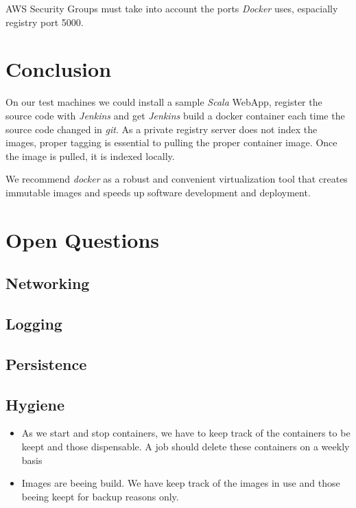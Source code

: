 \documentclass[11pt]{article}
\begin{document}
AWS Security Groups must take into account the ports \emph{Docker} uses, espacially registry port 5000.
\section{Conclusion}
\label{sec-7}

On our test machines we could install a sample \emph{Scala} WebApp, register the source code with \emph{Jenkins} and get \emph{Jenkins} build a docker container each time the source code changed in \emph{git}. As a private registry server does not index the images, proper tagging is essential to pulling the proper container image. Once the image is pulled, it is indexed locally.

We recommend \emph{docker} as a robust and convenient virtualization tool that creates immutable images and speeds up software development and deployment.  
\section{Open Questions}
\label{sec-8}
\subsection{Networking}
\label{sec-8-1}
\subsection{Logging}
\label{sec-8-2}
\subsection{Persistence}
\label{sec-8-3}
\subsection{Hygiene}
\label{sec-8-4}

\begin{itemize}
\item As we start and stop containers, we have to keep track of the containers to be keept and those dispensable. A job should delete these containers on a weekly basis
\item Images are beeing build. We have keep track of the images in use and those beeing keept for backup reasons only.
\end{itemize}
\end{document}
